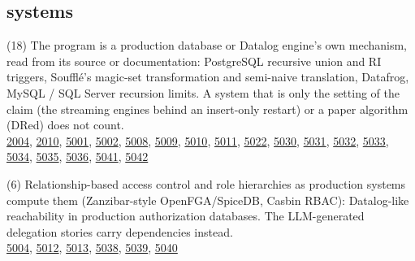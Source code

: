 \documentclass[10pt]{article}
\begin{document}
\subsection*{systems}
\begin{description}[leftmargin=1.2em,itemsep=2pt]
\item[\texttt{database-engine}\label{tag:database-engine}] (18) The program is a production database or Datalog engine's own mechanism, read from its source or documentation: PostgreSQL recursive union and RI triggers, Soufflé's magic-set transformation and semi-naive translation, Datafrog, MySQL / SQL Server recursion limits. A system that is only the setting of the claim (the streaming engines behind an insert-only restart) or a paper algorithm (DRed) does not count.\\ {\small \hyperref[case:Example2004]{2004}, \hyperref[case:Example2010]{2010}, \hyperref[case:Example5001]{5001}, \hyperref[case:Example5002]{5002}, \hyperref[case:Example5008]{5008}, \hyperref[case:Example5009]{5009}, \hyperref[case:Example5010]{5010}, \hyperref[case:Example5011]{5011}, \hyperref[case:Example5022]{5022}, \hyperref[case:Example5030]{5030}, \hyperref[case:Example5031]{5031}, \hyperref[case:Example5032]{5032}, \hyperref[case:Example5033]{5033}, \hyperref[case:Example5034]{5034}, \hyperref[case:Example5035]{5035}, \hyperref[case:Example5036]{5036}, \hyperref[case:Example5041]{5041}, \hyperref[case:Example5042]{5042}}
\item[\texttt{access-control}\label{tag:access-control}] (6) Relationship-based access control and role hierarchies as production systems compute them (Zanzibar-style OpenFGA/SpiceDB, Casbin RBAC): Datalog-like reachability in production authorization databases. The LLM-generated delegation stories carry dependencies instead.\\ {\small \hyperref[case:Example5004]{5004}, \hyperref[case:Example5012]{5012}, \hyperref[case:Example5013]{5013}, \hyperref[case:Example5038]{5038}, \hyperref[case:Example5039]{5039}, \hyperref[case:Example5040]{5040}}
\end{description}
\end{document}
